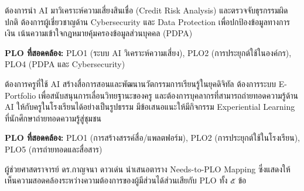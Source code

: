 \documentclass{meetingminutes}
\begin{document}
ต้องการนำ AI มาวิเคราะห์ความเสี่ยงสินเชื่อ (Credit Risk Analysis) และตรวจจับธุรกรรมผิดปกติ
ต้องการผู้เชี่ยวชาญด้าน Cybersecurity และ Data Protection เพื่อปกป้องข้อมูลทางการเงิน
เน้นความเข้าใจกฎหมายคุ้มครองข้อมูลส่วนบุคคล (PDPA)

\noindent\textbf{PLO ที่สอดคล้อง:} PLO1 (ระบบ AI วิเคราะห์ความเสี่ยง), PLO2 (การประยุกต์ใช้ในองค์กร), PLO4 (PDPA และ Cybersecurity)


ต้องการครูที่ใช้ AI สร้างสื่อการสอนและพัฒนานวัตกรรมการเรียนรู้ในยุคดิจิทัล
ต้องการระบบ E-Portfolio เพื่อสนับสนุนการเลื่อนวิทยฐานะของครู
และต้องการบุคลากรที่สามารถถ่ายทอดความรู้ด้าน AI ให้กับครูในโรงเรียนได้อย่างเป็นรูปธรรม
มีข้อเสนอแนะให้มีกิจกรรม Experiential Learning ที่นักศึกษาถ่ายทอดความรู้สู่ชุมชน

\noindent\textbf{PLO ที่สอดคล้อง:} PLO1 (การสร้างสรรค์สื่อ/แพลตฟอร์ม), PLO2 (การประยุกต์ใช้ในโรงเรียน), PLO5 (การถ่ายทอดและสื่อสาร)



ผู้ช่วยศาสตราจารย์ ดร.กาญจนา ดาวเด่น นำเสนอตาราง Needs-to-PLO Mapping
ซึ่งแสดงให้เห็นความสอดคล้องระหว่างความต้องการของผู้มีส่วนได้ส่วนเสียกับ PLO ทั้ง ๕ ข้อ
\end{document}
